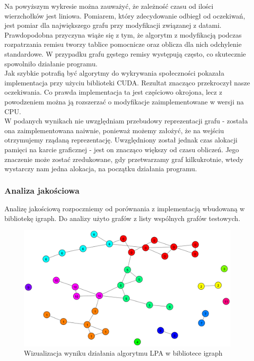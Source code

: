 \documentclass{article}
\begin{document}
Na powyższym wykresie można zauważyć, że zależność czasu od ilości wierzchołków jest liniowa. Pomiarem, który zdecydowanie odbiegł od oczekiwań, jest pomiar dla największego grafu przy modyfikacji związanej z datami. Prawdopodobna przyczyna wiąże się z tym, że algorytm z modyfikacją podczas rozpatrzania remisu tworzy tablice pomocnicze oraz oblicza dla nich odchylenie standardowe. W przypadku grafu gęstego remisy występują często, co skutecznie spowolniło działanie programu.\\

Jak szybkie potrafią być algorytmy do wykrywania społeczności pokazała implementacja przy użyciu biblioteki CUDA. Rezultat znacząco przekroczył nasze oczekiwania. Co prawda implementacja ta jest częściowo okrojona, lecz z powodzeniem można ją rozszerzać o modyfikacje zaimplementowane w wersji na CPU.\\


W podanych wynikach nie uwzględniam przebudowy reprezentacji grafu - została ona zaimplementowana naiwnie, ponieważ możemy założyć, że na wejściu otrzymujemy rządaną reprezentację. Uwzględniony został jednak czas alokacji pamięci na karcie graficznej - jest on znacząco większy od czasu obliczeń. Jego znaczenie może zostać zredukowane, gdy przetwarzamy graf kilkukrotnie, wtedy wystarczy nam jedna alokacja, na początku działania programu.

\subsubsection{Analiza jakościowa}

Analizę jakościową rozpoczniemy od porównania z implementacją wbudowaną w bibliotekę igraph. Do analizy użyto grafów z listy wspólnych grafów testowych.

\begin{figure}[H]
\centering
\includegraphics[width=\textwidth]{images/ms-build-lpa-0.png}
\caption{Wizualizacja wyniku działania algorytmu LPA w bibliotece igraph}
\end{figure}
\end{document}
